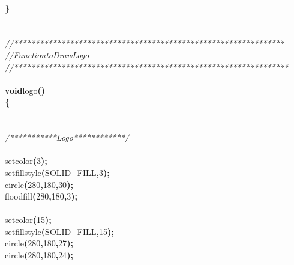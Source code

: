 \documentclass[a4paper, 10pt]{article}
\newcommand\SPC{\hspace*{0.6em}}
\newcommand{\CppAComment}[1]{\textit{\textcolor[rgb]{0.2,0.6,1}{#1}}}
\newcommand{\CppAIdentifier}[1]{#1}
\newcommand{\CppANumber}[1]{\textcolor[rgb]{0.5,0,0.5}{#1}}
\newcommand{\CppAReservedWord}[1]{\textbf{#1}}
\newcommand{\CppASpace}[1]{\colorbox[rgb]{1,1,1}{#1}}
\newcommand{\CppASymbol}[1]{\textbf{\textcolor[rgb]{1,0,0}{#1}}}
\begin{document}
\begin{ttfamily}
\\
\CppASymbol{\}}\\
\\
\\
\CppAComment{//***************************************************************}\\
\CppAComment{//\SPC \SPC \SPC Function\SPC to\SPC Draw\SPC Logo}\\
\CppAComment{//****************************************************************}\\
\\
\CppAReservedWord{void}\CppASpace{\SPC }\CppAIdentifier{logo}\CppASymbol{(}\CppASymbol{)}\\
\CppASymbol{\{}\\
\\
\\
\CppASpace{\SPC \SPC }\CppAComment{/***********\SPC Logo\SPC ************/}\\
\\
\CppASpace{\SPC \SPC \SPC \SPC }\CppAIdentifier{setcolor}\CppASymbol{(}\CppANumber{3}\CppASymbol{)}\CppASymbol{;}\\
\CppASpace{\SPC \SPC \SPC \SPC }\CppAIdentifier{setfillstyle}\CppASymbol{(}\CppAIdentifier{SOLID\_FILL}\CppASymbol{,}\CppANumber{3}\CppASymbol{)}\CppASymbol{;}\\
\CppASpace{\SPC \SPC \SPC \SPC }\CppAIdentifier{circle}\CppASymbol{(}\CppANumber{280}\CppASymbol{,}\CppANumber{180}\CppASymbol{,}\CppANumber{30}\CppASymbol{)}\CppASymbol{;}\\
\CppASpace{\SPC \SPC \SPC \SPC }\CppAIdentifier{floodfill}\CppASymbol{(}\CppANumber{280}\CppASymbol{,}\CppANumber{180}\CppASymbol{,}\CppANumber{3}\CppASymbol{)}\CppASymbol{;}\\
\\
\CppASpace{\SPC \SPC \SPC \SPC }\CppAIdentifier{setcolor}\CppASymbol{(}\CppANumber{15}\CppASymbol{)}\CppASymbol{;}\\
\CppASpace{\SPC \SPC \SPC \SPC }\CppAIdentifier{setfillstyle}\CppASymbol{(}\CppAIdentifier{SOLID\_FILL}\CppASymbol{,}\CppANumber{15}\CppASymbol{)}\CppASymbol{;}\\
\CppASpace{\SPC \SPC \SPC \SPC }\CppAIdentifier{circle}\CppASymbol{(}\CppANumber{280}\CppASymbol{,}\CppANumber{180}\CppASymbol{,}\CppANumber{27}\CppASymbol{)}\CppASymbol{;}\\
\CppASpace{\SPC \SPC \SPC \SPC }\CppAIdentifier{circle}\CppASymbol{(}\CppANumber{280}\CppASymbol{,}\CppANumber{180}\CppASymbol{,}\CppANumber{24}\CppASymbol{)}\CppASymbol{;}\\

\end{ttfamily}
\end{document}
